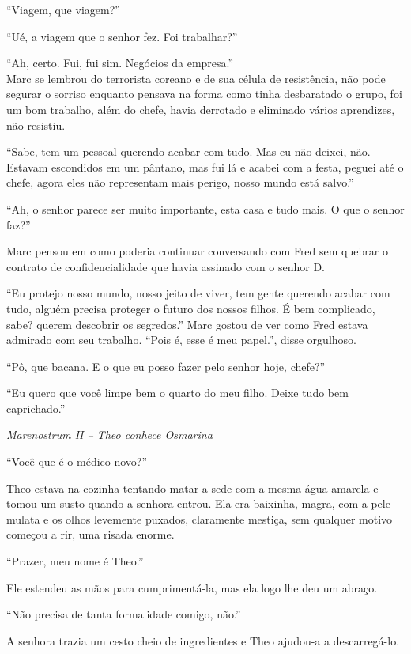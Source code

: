 ``Viagem, que viagem?''

``Ué, a viagem que o senhor fez. Foi trabalhar?''

``Ah, certo. Fui, fui sim. Negócios da empresa.''\\
Marc se lembrou do terrorista coreano e de sua célula de resistência,
não pode segurar o sorriso enquanto pensava na forma como tinha
desbaratado o grupo, foi um bom trabalho, além do chefe, havia derrotado
e eliminado vários aprendizes, não resistiu.

``Sabe, tem um pessoal querendo acabar com tudo. Mas eu não deixei, não.
Estavam escondidos em um pântano, mas fui lá e acabei com a festa,
peguei até o chefe, agora eles não representam mais perigo, nosso mundo
está salvo.''

``Ah, o senhor parece ser muito importante, esta casa e tudo mais. O que
o senhor faz?''

Marc pensou em como poderia continuar conversando com Fred sem quebrar o
contrato de confidencialidade que havia assinado com o senhor D.

``Eu protejo nosso mundo, nosso jeito de viver, tem gente querendo
acabar com tudo, alguém precisa proteger o futuro dos nossos filhos. É
bem complicado, sabe? querem descobrir os segredos.'' Marc gostou de ver
como Fred estava admirado com seu trabalho. ``Pois é, esse é meu
papel.'', disse orgulhoso.

``Pô, que bacana. E o que eu posso fazer pelo senhor hoje, chefe?''

``Eu quero que você limpe bem o quarto do meu filho. Deixe tudo bem
caprichado.''

\asterisc

\emph{Marenostrum II -- Theo conhece Osmarina}

``Você que é o médico novo?''

Theo estava na cozinha tentando matar a sede com a mesma água amarela e
tomou um susto quando a senhora entrou. Ela era baixinha, magra, com a
pele mulata e os olhos levemente puxados, claramente mestiça, sem
qualquer motivo começou a rir, uma risada enorme.

``Prazer, meu nome é Theo.''

Ele estendeu as mãos para cumprimentá-la, mas ela logo lhe deu um
abraço.

``Não precisa de tanta formalidade comigo, não.''

A senhora trazia um cesto cheio de ingredientes e Theo ajudou-a a
descarregá-lo.

